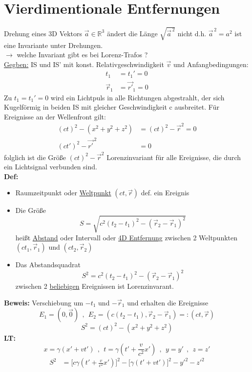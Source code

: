 \documentclass[titlepage,12pt,a4paper,ngerman]{report}
\begin{document}
{\section{Vierdimentionale Entfernungen}
Drehung eines 3D Vektors $ \vec{a} \in \mathbb{R}^3 $ ändert die Länge $ \sqrt{\vec{a}^{\,2}} $ nicht d.h. $ \vec{a}^{\, 2} = a^2 $ ist eine Invariante unter Drehungen.\\
$ \rightarrow $ welche Invariant gibt es bei Lorenz-Trafos ?\\[5pt]
\underline{Gegben:} IS und IS' mit konst. Relativgeschwindigkeit $ \vec{v} $ und Anfangbedingungen:
\begin{align*}
t_1 &= t_1' = 0\\
\vec{r}_1 &= \vec{r'}_1 = 0
\end{align*}
Zu $ t_1 = t_1' = 0 $ wird ein Lichtpuls in alle Richtungen abgestrahlt, der sich Kugelförmig in beiden IS mit gleicher Geschwindigkeit c ausbreitet. Für Ereignisse an der Wellenfront gilt:
\begin{align*}
(ct)^2 - (x^2 + y^2 + z^2) &= (ct)^2 - \vec{r}^2 = 0\\
(ct')^2 - \vec{r'}^{\, 2} &= 0
\end{align*}
folglich ist die Größe $ (ct)^2 - \vec{r}^2 $ Lorenzinvariant für alle Ereignisse, die durch ein Lichtsignal verbunden sind.\\
\textbf{Def:}
\begin{itemize}
	\item Raumzeitpunkt oder \underline{Weltpunkt} $ (ct,\vec{r}) $ def. ein Ereignis
	\item Die Größe
	$$S = \sqrt{c^2(t_2-t_1)^2 - (\vec{r}_2 - \vec{r}_1)^2}$$
	heißt \underline{Abstand} oder Intervall oder \underline{4D Entfernung} zwischen 2 Weltpunkten $ (ct_1,\vec{r}_1) $ und $ (ct_2,\vec{r}_2) $
	\item Das Abstandsquadrat
	$$S^2 = c^2 (t_2-t_1)^2- (\vec{r}_2 - \vec{r}_1)^2$$
	zwischen 2 \underline{beliebigen} Ereignissen ist Lorenzinvarant.
\end{itemize}
\textbf{Beweis:} Verschiebung um $ -t_1 $ und $ - \vec{r}_1 $ und erhalten die Ereignisse
$$E_1 = (0,\vec{0})\ \ , \ \ E_2 = (c(t_2-t_1) , \vec{r}_2 - \vec{r}_1) =: (ct,\vec{r})$$
$$S^2 = (ct)^2 - (x^2 + y^2 + z^2)$$
\textbf{LT:}
$$x = \gamma (x' + vt') \ \ , \ \ t = \gamma(t' + \frac{v}{c^2} x') \ \ , \ \ y = y' \ \ , \ \ z = z'$$
\begin{align*}
S^2 &= \bigg[c \gamma (t' + \frac{v}{c^2} x')\bigg]^2 - \bigg[\gamma (t' + vt')\bigg]^2 - y'^2 - z'^2\\

\end{align*}}
\end{document}
